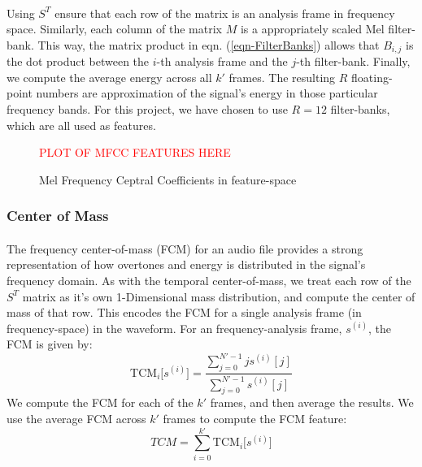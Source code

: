 \documentclass[12pt,letterpaper]{article}
\begin{document}
\paragraph*{}Using $S^T$ ensure that each row of the matrix is an analysis frame in frequency space. Similarly, each column of the matrix $M$ is a appropriately scaled Mel filter-bank. This way, the matrix product in eqn. (\ref{eqn-FilterBanks}) allows that $B_{i,j}$ is the dot product between the $i$-th analysis frame and the $j$-th filter-bank. Finally, we compute the average energy across all $k'$ frames. The resulting $R$ floating-point numbers are approximation of the signal's energy in those particular frequency bands. For this project, we have chosen to use $R = 12$ filter-banks, which are all used as features.

\begin{figure}[H]
\label{fig-FeatureMFCC}
\begin{center}
\textcolor{red}{PLOT OF MFCC FEATURES HERE}
\end{center}
\caption{Mel Frequency Ceptral Coefficients in feature-space}
\end{figure}



\subsubsection{Center of Mass}

\paragraph*{}The frequency center-of-mass (FCM) for an audio file provides a strong representation of how overtones and energy is distributed in the signal's frequency domain. As with the temporal center-of-mass, we treat each row of the $S^T$ matrix as it's own 1-Dimensional mass distribution, and compute the center of mass of that row. This encodes the FCM for a single analysis frame (in frequency-space) in the waveform. For an frequency-analysis frame, $s^{(i)}$, the FCM is given by:
\begin{equation}
\label{eqn-FeatureFCM}
\text{TCM}_{i}\big[ s^{(i)} \big] = \frac{\sum_{j=0}^{N'-1}j s^{(i)}[j]}{\sum_{j=0}^{N'-1}s^{(i)}[j]}
\end{equation}
We compute the FCM for each of the $k'$ frames, and then average the results. We use the average FCM across $k'$ frames to compute the FCM feature:
\begin{equation}
TCM = \sum_{i=0}^{k'} \text{TCM}_{i}\big[ s^{(i)} \big]
\end{equation}
\end{document}

